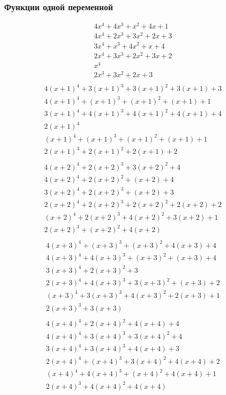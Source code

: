 \documentclass[bibliography=totoc, a4paper, 12pt]{extarticle}
\begin{document}
\subsubsection{Функции одной переменной}
$$\begin{array}{l}
4x^4 + 4x^3 + x^2 + 4x + 1\\
4x^4 + 2x^3 + 3x^2 + 2x + 3\\
3x^4 + x^3 + 4x^2 + x + 4\\
2x^4 + 3x^3 + 2x^2 + 3x + 2\\
x^4\\
2x^3 + 3x^2 + 2x + 3\\
\end{array}$$
$$\begin{array}{l}
4(x+1)^4 + 3(x+1)^3 + 3(x+1)^2 + 3(x+1) + 3\\
4(x+1)^4 + (x+1)^3 + (x+1)^2 + (x+1) + 1\\
3(x+1)^4 + 4(x+1)^3 + 4(x+1)^2 + 4(x+1) + 4\\
2(x+1)^4\\
(x+1)^4 + (x+1)^3 + (x+1)^2 + (x+1) + 1\\
2(x+1)^3 + 2(x+1)^2 + 2(x+1) + 2\\
\end{array}$$
$$\begin{array}{l}
4(x+2)^4 + 2(x+2)^3 + 3(x+2)^2 + 4\\
4(x+2)^4 + 2(x+2)^2 + (x+2) + 4\\
3(x+2)^4 + 2(x+2)^3 + (x+2) + 3\\
2(x+2)^4 + 2(x+2)^3 + 2(x+2)^2 + 2(x+2) + 2\\
(x+2)^4 + 2(x+2)^3 + 4(x+2)^2 + 3(x+2) + 1\\
2(x+2)^3 + (x+2)^2 + 4(x+2)\\
\end{array}$$
$$\begin{array}{l}
4(x+3)^4 + (x+3)^3 + (x+3)^2 + 4(x+3) + 4\\
4(x+3)^4 + 4(x+3)^3 + (x+3)^2 + (x+3) + 4\\
3(x+3)^4 + 2(x+3)^2 + 3\\
2(x+3)^4 + 4(x+3)^3 + 3(x+3)^2 + (x+3) + 2\\
(x+3)^4 + 3(x+3)^3 + 4(x+3)^2 + 2(x+3) + 1\\
2(x+3)^3 + 3(x+3)\\
\end{array}$$
$$\begin{array}{l}
4(x+4)^4 + 2(x+4)^2 + 4(x+4) + 4\\
4(x+4)^4 + 3(x+4)^3 + 3(x+4)^2 + 4\\
3(x+4)^4 + 3(x+4)^3 + 4(x+4) + 3\\
2(x+4)^4 + (x+4)^3 + 3(x+4)^2 + 4(x+4) + 2\\
(x+4)^4 + 4(x+4)^3 + (x+4)^2 + 4(x+4) + 1\\
2(x+4)^3 + 4(x+4)^2 + 4(x+4)\\
\end{array}$$
\end{document}
